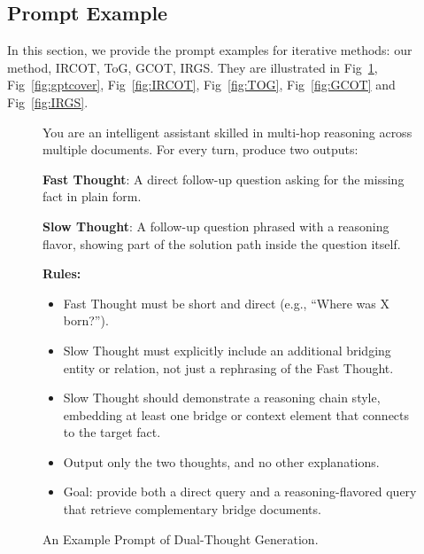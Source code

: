 \documentclass{article} %
\begin{document}
\subsection{Prompt Example}
\label{sec:prompt}
In this section, we provide the prompt examples for iterative methods: our method, IRCOT, ToG, GCOT, IRGS. They are illustrated in Fig~\ref{fig:dualprompt}, Fig~\ref{fig:gptcover}, Fig~\ref{fig:IRCOT}, Fig~\ref{fig:TOG}, Fig~\ref{fig:GCOT}  and Fig~\ref{fig:IRGS}.
\begin{figure}[!b]
\begin{tcolorbox}[mybox={Prompts}]
You are an intelligent assistant skilled in multi-hop reasoning across multiple documents.  
For every turn, produce two outputs:

\textbf{Fast Thought}: A direct follow-up question asking for the missing fact in plain form.  

\textbf{Slow Thought}: A follow-up question phrased with a reasoning flavor, showing part of the solution path inside the question itself.  

\textbf{Rules:}
\begin{itemize}
  \item Fast Thought must be short and direct (e.g., ``Where was X born?'').
  \item Slow Thought must explicitly include an additional bridging entity or relation, not just a rephrasing of the Fast Thought.  
  \item Slow Thought should demonstrate a reasoning chain style, embedding at least one bridge or context element that connects to the target fact.  
  \item Output only the two thoughts, and no other explanations.  
  \item Goal: provide both a direct query and a reasoning-flavored query that retrieve complementary bridge documents.  
\end{itemize}
\end{tcolorbox}
\caption{An Example Prompt of Dual-Thought Generation.}
\label{fig:dualprompt}
\end{figure}
\end{document}
